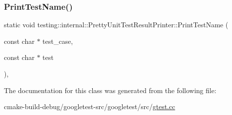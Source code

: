 \subsubsection{\texorpdfstring{PrintTestName()}{PrintTestName()}}
{\footnotesize\ttfamily static void testing\+::internal\+::\+Pretty\+Unit\+Test\+Result\+Printer\+::\+Print\+Test\+Name (\begin{DoxyParamCaption}\item[{const char $\ast$}]{test\+\_\+case,  }\item[{const char $\ast$}]{test }\end{DoxyParamCaption})\hspace{0.3cm}{\ttfamily [inline]}, {\ttfamily [static]}}



The documentation for this class was generated from the following file\+:\begin{DoxyCompactItemize}
\item 
cmake-\/build-\/debug/googletest-\/src/googletest/src/\mbox{\hyperlink{gtest_8cc}{gtest.\+cc}}\end{DoxyCompactItemize}

